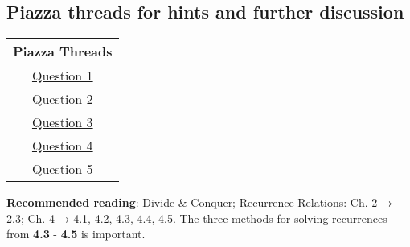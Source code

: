 \documentclass[12pt]{article}
\begin{document}
\hrulefill
\pagebreak

\subsection*{Piazza threads for hints and further discussion}
\begin{center}
    \begin{tabular}{|c|}
    \hline
    Piazza Threads \\ [0.5ex] 
    \hline \hline 
    \href{https://piazza.com/class/ka2roz7rb9m3j4?cid=29}{Question 1}\\
    \href{https://piazza.com/class/ka2roz7rb9m3j4?cid=30}{Question 2}\\
    \href{https://piazza.com/class/ka2roz7rb9m3j4?cid=31}{Question 3}\\
    \href{https://piazza.com/class/ka2roz7rb9m3j4?cid=32}{Question 4}\\
    \href{https://piazza.com/class/ka2roz7rb9m3j4?cid=33}{Question 5}\\
    
    \hline
    \end{tabular}
\end{center}

\textbf{Recommended reading}: Divide & Conquer; Recurrence Relations: Ch. 2 →  2.3; Ch. 4 →  4.1, 4.2, 4.3, 4.4, 4.5. The three methods for solving recurrences from \textbf{4.3} - \textbf{4.5} is important. 

\pagebreak
\end{document}
